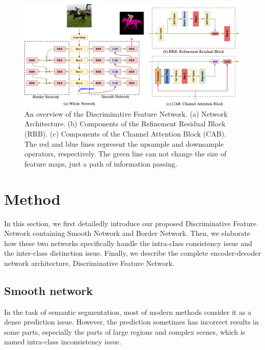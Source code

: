 \documentclass[10pt,twocolumn,letterpaper]{article}
\begin{document}

\begin{figure}[t]
\label{fig:network}
\includegraphics[width=\linewidth]{whole_network.pdf}
\vspace{-4mm}
\caption{An overview of the Discriminative Feature Network. 
(a) Network Architecture.
(b) Components of the Refinement Residual Block (RRB).
(c) Components of the Channel Attention Block (CAB).
The red and blue lines represent the upsample and downsample operators, respectively.
The green line can not change the size of feature maps, just a path of information passing.}
\centering
\end{figure}


\section{Method}
\label{sec:method}
In this section, we first detailedly introduce our proposed Discriminative Feature Network containing Smooth Network and Border Network. Then, we elaborate how these two networks specifically handle the intra-class consistency issue and the inter-class distinction issue. Finally, we describe the complete encoder-decoder network architecture, Discriminative Feature Network. 

\subsection{Smooth network}
\label{sec:sn}
In the task of semantic segmentation, most of modern methods consider it as a dense prediction issue. However, the prediction sometimes has incorrect results in some parts, especially the parts of large regions and complex scenes, which is named intra-class inconsistency issue. 
\end{document}
